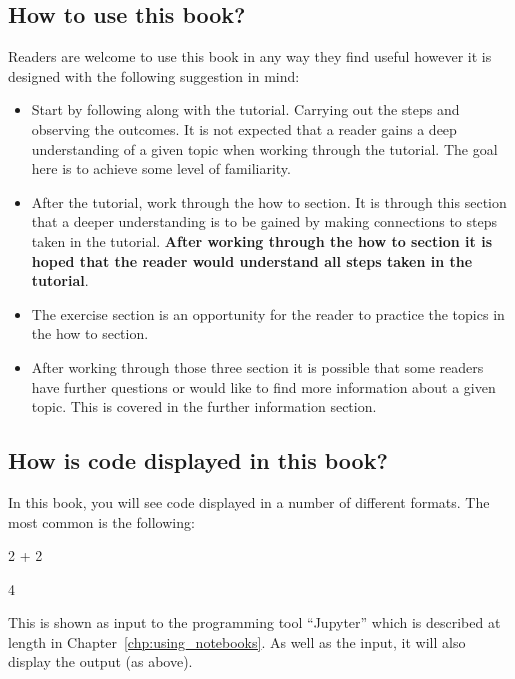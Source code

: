 \subsection{How to use this book?}
Readers are welcome to use this book in any way they find useful however it is
designed with the following suggestion in mind:
\begin{itemize}
\item Start by following along with the tutorial. Carrying out the steps and
observing the outcomes. It is not expected that a reader gains a deep
understanding of a given topic when working through the tutorial. The goal
here is to achieve some level of familiarity.

\item After the tutorial, work through the how to section. It is through this
section that a deeper understanding is to be gained by making connections to
steps taken in the tutorial. \textbf{After working through the how to section it is
hoped that the reader would understand all steps taken in the tutorial}.

\item The exercise section is an opportunity for the reader to practice the topics
in the how to section.

\item After working through those three section it is possible that some readers
have further questions or would like to find more information about a
given topic. This is covered in the further information section.

\end{itemize}

\subsection{How is code displayed in this book?}

In this book, you will see code displayed in a number of different formats. The
most common is the following:

\begin{pyin}
2 + 2
\end{pyin}

\begin{raw}
4
\end{raw}

This is shown as input to the programming tool ``Jupyter'' which is described at
length in Chapter~\ref{chp:using_notebooks}. As well as the input, it will also
display the output (as above).

